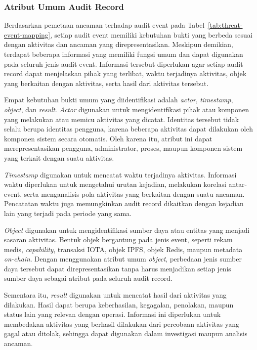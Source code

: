 \subsubsection{Atribut Umum Audit Record}

Berdasarkan pemetaan ancaman terhadap audit event pada Tabel~\ref{tab:threat-event-mapping}, setiap audit event memiliki kebutuhan bukti yang berbeda sesuai dengan aktivitas dan ancaman yang direpresentasikan. Meskipun demikian, terdapat beberapa informasi yang memiliki fungsi umum dan dapat digunakan pada seluruh jenis audit event. Informasi tersebut diperlukan agar setiap audit record dapat menjelaskan pihak yang terlibat, waktu terjadinya aktivitas, objek yang berkaitan dengan aktivitas, serta hasil dari aktivitas tersebut.

Empat kebutuhan bukti umum yang diidentifikasi adalah \textit{actor}, \textit{timestamp}, \textit{object}, dan \textit{result}. \textit{Actor} digunakan untuk mengidentifikasi pihak atau komponen yang melakukan atau memicu aktivitas yang dicatat. Identitas tersebut tidak selalu berupa identitas pengguna, karena beberapa aktivitas dapat dilakukan oleh komponen sistem secara otomatis. Oleh karena itu, atribut ini dapat merepresentasikan pengguna, administrator, proses, maupun komponen sistem yang terkait dengan suatu aktivitas.

\textit{Timestamp} digunakan untuk mencatat waktu terjadinya aktivitas. Informasi waktu diperlukan untuk mengetahui urutan kejadian, melakukan korelasi antar-event, serta menganalisis pola aktivitas yang berkaitan dengan suatu ancaman. Pencatatan waktu juga memungkinkan audit record dikaitkan dengan kejadian lain yang terjadi pada periode yang sama.

\textit{Object} digunakan untuk mengidentifikasi sumber daya atau entitas yang menjadi sasaran aktivitas. Bentuk objek bergantung pada jenis event, seperti rekam medis, \textit{capability}, transaksi IOTA, objek IPFS, objek Redis, maupun metadata \textit{on-chain}. Dengan menggunakan atribut umum \textit{object}, perbedaan jenis sumber daya tersebut dapat direpresentasikan tanpa harus menjadikan setiap jenis sumber daya sebagai atribut pada seluruh audit record.

Sementara itu, \textit{result} digunakan untuk mencatat hasil dari aktivitas yang dilakukan. Hasil dapat berupa keberhasilan, kegagalan, penolakan, maupun status lain yang relevan dengan operasi. Informasi ini diperlukan untuk membedakan aktivitas yang berhasil dilakukan dari percobaan aktivitas yang gagal atau ditolak, sehingga dapat digunakan dalam investigasi maupun analisis ancaman.

